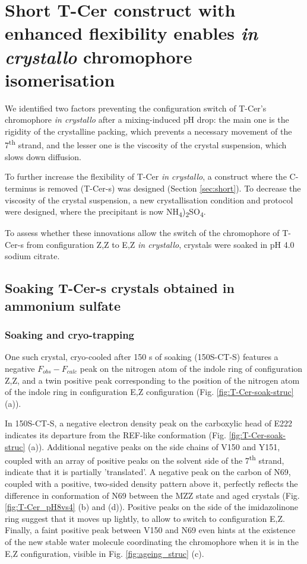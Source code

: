 \section{Short T-Cer construct with enhanced flexibility enables \textit{in crystallo} chromophore isomerisation}

We identified two factors preventing the configuration switch of T-Cer's chromophore \textit{in crystallo} after a mixing-induced pH drop: the main one is the rigidity of the crystalline packing, which prevents a necessary movement of the 7\textsuperscript{th} strand, and the lesser one is the viscosity of the crystal suspension, which slows down diffusion. 

To further increase the flexibility of T-Cer \textit{in crystallo}, a construct where the C-terminus is removed (T-Cer-s) was designed (Section \ref{sec:short}). To decrease the viscosity of the crystal suspension, a new crystallisation condition and protocol were designed, where the precipitant is now NH\textsubscript{4})\textsubscript{2}SO\textsubscript{4}.  

To assess whether these innovations allow the switch of the chromophore of T-Cer-s from configuration Z,Z to E,Z \textit{in crystallo}, crystals were soaked in pH 4.0 sodium citrate. 

\subsection{Soaking T-Cer-s crystals obtained in ammonium sulfate}\label{sec:soaking}

\subsubsection{Soaking and cryo-trapping}

One such crystal, cryo-cooled after 150 s of soaking (150S-CT-S) features a negative \(F_{obs} - F_{calc}\) peak on the nitrogen atom of the indole ring of configuration Z,Z, and a twin positive peak corresponding to the position of the nitrogen atom of the indole ring in configuration E,Z configuration  (Fig. \ref{fig:T-Cer-soak-struc} (a)). 

In 150S-CT-S, a negative electron density peak on the carboxylic head of E222 indicates its departure from the REF-like conformation (Fig. \ref{fig:T-Cer-soak-struc} (a)). Additional negative peaks on the side chains of V150 and Y151, coupled with an array of positive peaks on the solvent side of the 7\textsuperscript{th} strand, indicate that it is partially 'translated'. A negative peak on the carbon of N69, coupled with a positive, two-sided density pattern above it, perfectly reflects the difference in conformation of N69 between the MZZ state and aged crystals (Fig. \ref{fig:T-Cer_pH8vs4} (b) and (d)). Positive peaks on the side of the imidazolinone ring  suggest that it moves up lightly, to allow to switch to configuration E,Z. Finally, a faint positive peak between V150 and N69 even hints at the existence of the new stable water molecule coordinating the chromophore when it is in the E,Z configuration, visible in Fig. \ref{fig:ageing_struc} (c).

